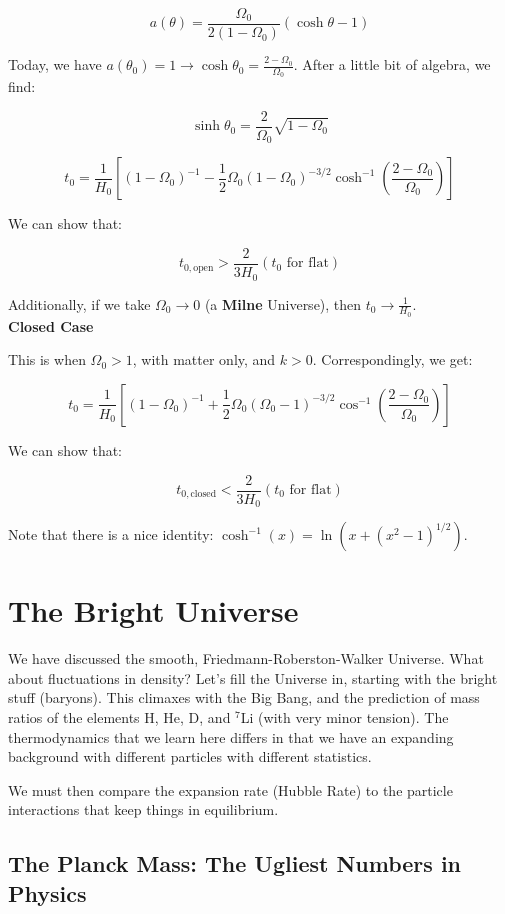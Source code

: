 \documentclass{article}
\newcommand{\be}{\begin{equation}}
\newcommand{\ee}{\end{equation}}
\begin{document}
\be
a(\theta) = \frac{\Omega_0}{2\left(1-\Omega_0\right)}\left(\cosh\theta - 1\right)
\ee

Today, we have $a(\theta_0) = 1 \rightarrow \cosh\theta_0 = \frac{2-\Omega_0}{\Omega_0}$. After a little bit of algebra, we find:

\be
\sinh\theta_0 = \frac{2}{\Omega_0}\sqrt{1-\Omega_0}
\ee

\be
t_0 = \frac{1}{H_0} \left[(1-\Omega_0)^{-1} - \frac12 \Omega_0 \left(1-\Omega_0\right)^{-3/2}\cosh^{-1}\left(\frac{2-\Omega_0}{\Omega_0}\right) \right]
\ee

We can show that:

\be
t_{0,\text{open}} > \frac{2}{3H_0} (t_0 \text{ for flat})
\ee

Additionally, if we take $\Omega_0 \to 0$ (a \textbf{Milne} Universe), then $t_0 \to \frac{1}{H_0}$.\\

\noindent\textbf{Closed Case}

This is when $\Omega_0 > 1$, with matter only, and $k>0$. Correspondingly, we get:

\be
t_0 = \frac{1}{H_0} \left[(1-\Omega_0)^{-1} + \frac12 \Omega_0 \left(\Omega_0 - 1\right)^{-3/2}\cos^{-1}\left(\frac{2-\Omega_0}{\Omega_0}\right) \right]
\ee

We can show that:

\be
t_{0,\text{closed}} < \frac{2}{3H_0} (t_0 \text{ for flat})
\ee

Note that there is a nice identity: $\cosh^{-1}(x) = \ln\left(x + (x^2-1)^{1/2}\right)$. 


\section{The Bright Universe}

We have discussed the smooth, Friedmann-Roberston-Walker Universe. What about fluctuations in density? Let's fill the Universe in, starting with the bright stuff (baryons). This climaxes with the Big Bang, and the prediction of mass ratios of the elements H, He, D, and $^7$Li (with very minor tension). The thermodynamics that we learn here differs in that we have an expanding background with different particles with different statistics. 

We must then compare the expansion rate (Hubble Rate) to the particle interactions that keep things in equilibrium. 

\subsection{The Planck Mass: The Ugliest Numbers in Physics}
\end{document}
